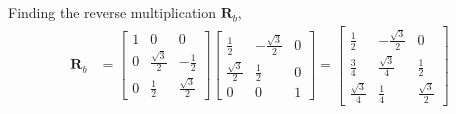 \documentclass[]{article}
\begin{document}
\subsection{}

Finding the reverse multiplication \(\mathbf{R}_b\),
\begin{align}
	\mathbf{R}_b &= 
	\begin{bmatrix}
	1 & 0 & 0 \\
	0 & \frac{\sqrt{3}}{2} & -\frac{1}{2} \\
	0 & \frac{1}{2} & \frac{\sqrt{3}}{2}
	\end{bmatrix} 
	\begin{bmatrix}
	\frac{1}{2} & -\frac{\sqrt{3}}{2} & 0 \\
	\frac{\sqrt{3}}{2} & \frac{1}{2} & 0 \\
	0 & 0 & 1
	\end{bmatrix} = 
	\begin{bmatrix}
	\frac{1}{2} & -\frac{\sqrt{3}}{2} & 0 \\
	\frac{3}{4} & \frac{\sqrt{3}}{4} & \frac{1}{2} \\
	\frac{\sqrt{3}}{4} & \frac{1}{4} & \frac{\sqrt{3}}{2} 
	\end{bmatrix}
\end{align}

\subsection{}
\end{document}
